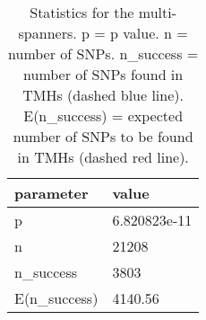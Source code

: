 \begin{table}

\caption{\label{tab:snp_stats}Statistics for the multi-spanners. p = p value. n = number of SNPs. n\_success = number of SNPs found in TMHs (dashed blue line). E(n\_success) = expected number of SNPs to be found in TMHs (dashed red line). }
\centering
\begin{tabular}[t]{l|l}
\hline
parameter & value\\
\hline
p & 6.820823e-11\\
\hline
n & 21208\\
\hline
n\_success & 3803\\
\hline
E(n\_success) & 4140.56\\
\hline
\end{tabular}
\end{table}